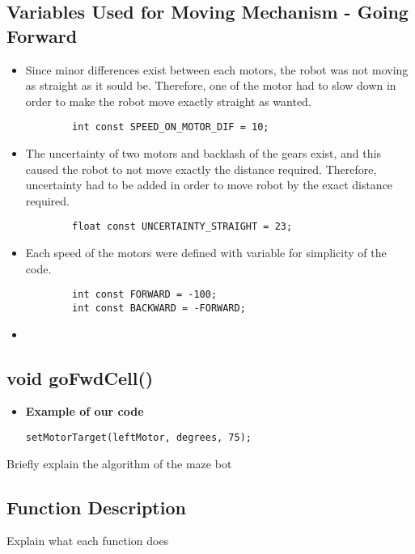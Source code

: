 \documentclass[11pt]{article}
\begin{document}
\subsection{Variables Used for Moving Mechanism - Going Forward}
\begin{itemize}
\item Since minor differences exist between each motors, the robot was not moving as straight as it sould be. Therefore, one of the motor had to slow down in order to make the robot move exactly straight as wanted.
	\begin{verbatim}
		int const SPEED_ON_MOTOR_DIF = 10;
	\end{verbatim} 
\item The uncertainty of two motors and backlash of the gears exist, and this caused the robot to not move exactly the distance required. Therefore, uncertainty had to be added in order to move robot by the exact distance required. 
	\begin{verbatim}
		float const UNCERTAINTY_STRAIGHT = 23;
	\end{verbatim} 
\item Each speed of the motors were defined with variable for simplicity of the code. 
	\begin{verbatim}
		int const FORWARD = -100;
		int const BACKWARD = -FORWARD;
	\end{verbatim} 
\item
\end{itemize}







\subsection{void goFwdCell()}
\begin{itemize}
\item \textbf{Example of our code}
\begin{verbatim}
setMotorTarget(leftMotor, degrees, 75);
\end{verbatim}
\end{itemize}


Briefly explain the algorithm of the maze bot 

\subsection{Function Description}

Explain what each function does 
\end{document}
